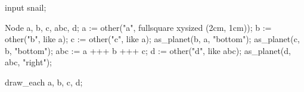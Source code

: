 \usemodule[zhfonts]
\startMPpage
input snail;

Node a, b, c, abc, d;
a := other("a", fullsquare xysized (2cm, 1cm));
b := other("b", like a);
c := other("c", like a);
as_planet(b, a, "bottom");
as_planet(c, b, "bottom");
abc := a +++ b +++ c;
d := other("d", like abc);
as_planet(d, abc, "right");

draw_each a, b, c, d;
\stopMPpage
